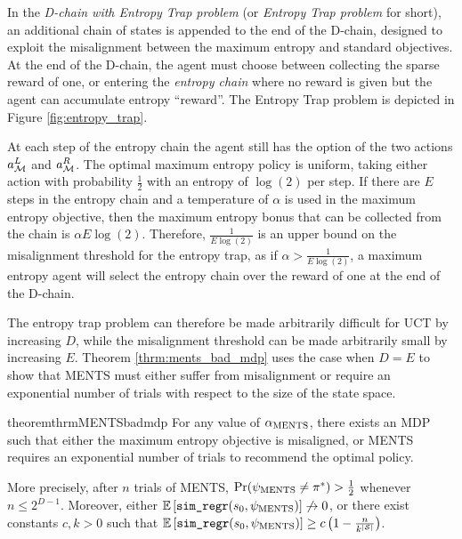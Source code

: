     In the \textit{D-chain with Entropy Trap problem} (or \textit{Entropy Trap problem} for short), an additional chain of states is appended to the end of the D-chain, designed to exploit the misalignment between the maximum entropy and standard objectives. At the end of the D-chain, the agent must choose between collecting the sparse reward of one, or entering the \textit{entropy chain} where no reward is given but the agent can accumulate entropy ``reward''. The Entropy Trap problem is depicted in Figure \ref{fig:entropy_trap}.

    At each step of the entropy chain the agent still has the option of the two actions $a^L_{\mathcal{M}}$ and $a^R_{\mathcal{M}}$. The optimal maximum entropy policy is uniform, taking either action with probability $\frac{1}{2}$ with an entropy of $\log(2)$ per step. If there are $E$ steps in the entropy chain and a temperature of $\alpha$ is used in the maximum entropy objective, then the maximum entropy bonus that can be collected from the chain is $\alpha E\log(2)$. Therefore, $\frac{1}{E\log(2)}$ is an upper bound on the misalignment threshold for the entropy trap, as if $\alpha > \frac{1}{E\log(2)}$, a maximum entropy agent will select the entropy chain over the reward of one at the end of the D-chain. 

    The entropy trap problem can therefore be made arbitrarily difficult for UCT by increasing $D$, while the misalignment threshold can be made arbitrarily small by increasing $E$. Theorem \ref{thrm:ments_bad_mdp} uses the case when $D=E$ to show that MENTS must either suffer from misalignment or require an exponential number of trials with respect to the size of the state space.
    \begin{restatable}{theorem}{thrmMENTSbadmdp} \label{thrm:ments_bad_mdp}
        For any value of ${\alpha_{{\textnormal{MENTS}}}}$, there exists an MDP such that either the maximum entropy objective is misaligned, or MENTS requires an exponential number of trials to recommend the optimal policy.

        More precisely, after $n$ trials of MENTS, $\Pr(\psi_{{\textnormal{MENTS}}}\neq \pi^*) > \frac{1}{2}$ whenever $n\leq 2^{D-1}$. Moreover, either $\mathbb{E}\left[{\textnormal{\texttt{sim\_regr}}}(s_0,\psi_{{\textnormal{MENTS}}})\right]\not\rightarrow 0$, or there exist constants $c,k>0$ such that $\mathbb{E}\left[{\textnormal{\texttt{sim\_regr}}}(s_0,\psi_{{\textnormal{MENTS}}})\right] \geq c\left(1 - \frac{n}{k^{|\mathcal{S}|}}\right)$.
    \end{restatable}

